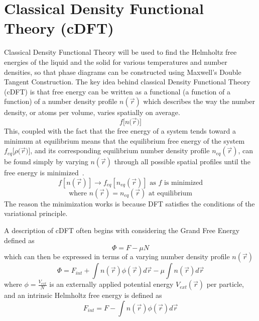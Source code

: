 \documentclass[double,12pt]{beavtex}
\begin{document}
\section{Classical Density Functional Theory (cDFT)}

Classical Density Functional Theory will be used to find the 
Helmholtz free energies of the liquid and the solid for various 
temperatures and number densities, so that phase diagrams can be 
constructed using Maxwell's Double Tangent Construction. 
The key idea behind classical Density Functional Theory (cDFT) is that 
free energy can be written as a functional (a function of a function) of 
a number density profile $n(\vec{r})$ which describes the way the number 
density, or atoms per volume, varies spatially on average. 
\begin{displaymath}{f[n(}\vec{r}{)]}\end{displaymath}
This, coupled with the fact that the free energy of a system tends toward 
a minimum at equilibrium means that the equilibrium free energy of the 
system ${f_{eq}}{[}\rho{(}\vec{r}{)]}$, and its corresponding equilibrium 
number density profile $n_{eq}(\vec r)$, can be found simply by varying 
$n(\vec{r})$ through all possible spatial profiles until the free energy 
is minimized~\cite{MoritaDFT}. 
\begin{displaymath}f[n(\vec r)]\rightarrow f_{eq}[n_{eq}(\vec r)]  \mbox{ as $f$ is minimized} \end{displaymath}
\begin{displaymath}{\mbox{where }  n(\vec{r})=n_{eq}(\vec r)  \mbox{ at equilibrium}}\end{displaymath}
The reason the minimization works is because DFT satisfies the conditions 
of the variational principle. 

A description of cDFT often begins with considering the Grand Free 
Energy defined as
\begin{equation}\Phi=F-\mu{N}\end{equation}
which can then be expressed in terms of a varying number density 
profile $n(\vec r)$
\begin{equation}\label{GrandFE}\Phi= F_{int} +\int n(\vec{r})\phi{(\vec r)}d\vec{r}-\mu\int n(\vec r)d\vec{r}\end{equation}
where $\phi=\frac{V_{ext}}{N}$ is an externally applied potential energy 
$V_{ext}(\vec r)$ per particle, and an intrinsic Helmholtz free energy 
is defined as
\begin{equation}F_{int} = F - \int n(\vec{r})\phi{(\vec r)}d\vec{r}\end{equation}  
\end{document}
